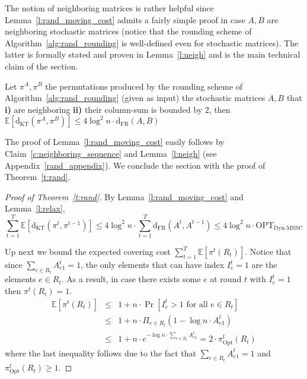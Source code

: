 \documentclass[a4paper,UKenglish,cleveref,autoref, thm-restate]{lipics-v2019}
\def\DSSC{\mathrm{Dyn}\text{-}\mathrm{MSSC}}
\def\dkt{\mathrm{d}_{\mathrm{KT}}}
\def\dfr{\mathrm{d}_{\mathrm{FR}}}
\begin{document}
\noindent The notion of neighboring matrices is rather helpful since Lemma~\ref{l:rand_moving_cost} admits a fairly simple proof in case $A,B$ are neighboring stochastic matrices (notice
that the rounding scheme of
Algorithm~\ref{alg:rand_rounding} is well-defined even for stochastic matrices). The latter is formally stated and proven in Lemma~\ref{l:neigh} and is the main technical claim of the section.

\begin{lemma}\label{l:neigh}
Let $\pi^A,\pi^B$ the permutations produced by the rounding scheme of
Algorithm~\ref{alg:rand_rounding} (given as input) the stochastic matrices $A,B$ that 
\textbf{i)} are neighboring \textbf{ii)} their column-sum is bounded by $2$, then
$\mathbb E[\dkt(\pi^A,\pi^B)] \leq 4 \log^2 n \cdot \dfr(A,B)$
\end{lemma}
\noindent The proof of Lemma~\ref{l:rand_moving_cost} easily follows by Claim~\ref{c:neighboring_sequence} and Lemma~\ref{l:neigh} (see Appendix~\ref{rand_appendix}). We conclude the section with the proof of Theorem~\ref{t:rand}.
\begin{proof}[Proof of Theorem~\ref{t:rand}]
By Lemma~\ref{l:rand_moving_cost} and Lemma~\ref{l:relax},
$$ \sum_{t=1}^T \mathbb{E}\left[\dkt(\pi^t,\pi^{t-1})\right] \leq 
4\log^2 n \cdot \sum_{t=1}^T \dfr(A^t,A^{t-1}) \leq 4\log^2 n \cdot \mathrm{OPT}_{\DSSC}
$$

\noindent Up next we bound the expected covering cost $\sum_{t=1}^T \mathbb{E}\left[\pi^t(R_t)\right]$. Notice that since $\sum_{e \in R_t} A_{e1}^t = 1$, the only elements that can have index $I_e^t = 1$ are the elements $e \in R_t$. As a result, in case there exists some $e$ at round $t$ with $I_e^t = 1$ then $\pi^t(R_t) = 1$.
\begin{eqnarray*}
\mathbb{E}\left[\pi^t(R_t)\right] &\leq& 1 + n \cdot \Pr \left[ I_e^t >1 \text{ for all } e\in R_t \right]\\
&\leq& 1 + n \cdot \Pi_{e \in R_t} \left(1 - \log n \cdot A_{e1}^t\right)\\
&\leq& 1 + n \cdot e^{- \log n \cdot \sum_{e \in R_t}A_{e1}^t}= 2 \cdot  \pi_{\mathrm{Opt}}^t(R_t)
\end{eqnarray*}
where the last inequality follows due to the fact that $\sum_{e \in R_t} A_{e1}^t = 1$ and $\pi_{\mathrm{Opt}}^t(R_t) \geq 1$.
\end{proof}
\end{document}

